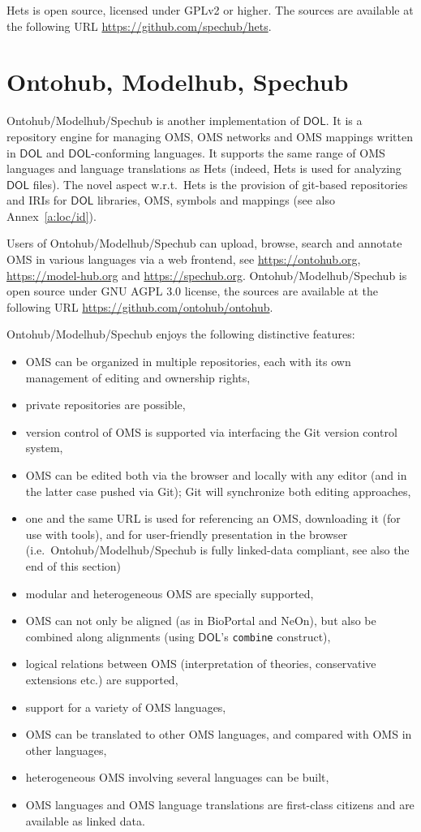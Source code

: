 \documentclass[10pt,fleqn,final]{scrreprt}
\newcommand*{\syntax}[1]{\texttt{#1}}
\newcommand*{\DOL}{\ensuremath{\mathsf{DOL}}\xspace}
\newcommand{\sclause}[1]{\section{#1}}
\begin{document}
Hets  is open source, licensed under GPLv2 or higher. The sources are
available at the following URL \url{https://github.com/spechub/hets}.


\sclause{Ontohub, Modelhub, Spechub}\label{a:ontohub}

Ontohub/Modelhub/Spechub is  another implementation  of
\DOL. It is a repository engine for managing OMS, OMS networks and OMS
mappings written in \DOL and \DOL-conforming languages.  It supports the
same range of OMS languages and language translations as Hets (indeed,
Hets is used for analyzing \DOL files). The novel aspect w.r.t.\ Hets
is the provision of git-based repositories and IRIs for \DOL libraries,
OMS, symbols and mappings (see also Annex~\ref{a:loc/id}).

Users of Ontohub/Modelhub/Spechub can upload, browse, search and annotate 
OMS in various languages via a web frontend, 
see \url{https://ontohub.org}, \url{https://model-hub.org} and \url{https://spechub.org}.
Ontohub/Modelhub/Spechub is open source under GNU AGPL 3.0 license,  the sources are available at the following URL 
\url{https://github.com/ontohub/ontohub}.

Ontohub/Modelhub/Spechub enjoys the following distinctive features:
\begin{itemize}
  \item OMS can be organized in multiple repositories, each
     with its own management of editing and ownership rights,
  \item private repositories are possible,
  \item version control of OMS is supported via interfacing
   the Git version control system,
  \item OMS can be edited both via the browser and locally with any
  editor (and in the latter case pushed via Git); Git will synchronize both editing approaches,
  \item one and the same URL is used for referencing an OMS, downloading
     it (for use with tools), and for user-friendly presentation in
     the browser (i.e.\ Ontohub/Modelhub/Spechub is fully linked-data compliant,  see also the end of this section)
  \item modular and heterogeneous OMS are specially supported,
  \item OMS can not only be aligned (as in BioPortal and NeOn), but also be combined along alignments (using \DOL's \syntax{combine} construct),
  \item logical relations between OMS (interpretation of theories, conservative
  extensions etc.) are supported,
  \item support for a variety of OMS languages, 
  \item OMS can be translated to other OMS languages, and compared with
   OMS in other languages,
  \item heterogeneous OMS involving several languages can be built,
  \item OMS languages and OMS language translations are first-class
   citizens and are available as linked data.
\end{itemize}
\end{document}
